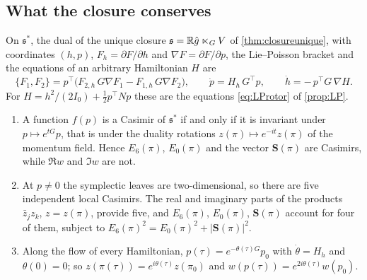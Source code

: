 \subsection{What the closure conserves}
\label{sec:restconserve}

On $\mathfrak s^*$, the dual of the unique closure $\mathfrak s=\mathbb{R}\hat g\ltimes_GV$ of \cref{thm:closureunique}, with coordinates $(h,p)$,
$F_h=\partial F/\partial h$ and $\nabla F=\partial F/\partial p$, the Lie--Poisson bracket and the equations of an arbitrary Hamiltonian $H$ are
\begin{equation}
\label{eq:restLPgen}
\{F_1,F_2\}=p^{\!\top}\bigl(F_{2,h}\,G\nabla F_1-F_{1,h}\,G\nabla F_2\bigr),\qquad
\dot p=H_h\,G^{\!\top}p,\qquad \dot h=-\,p^{\!\top}G\,\nabla H .
\end{equation}
For $H=h^2/(2I_0)+\tfrac12p^{\!\top}Np$ these are the equations \eqref{eq:LProtor} of \cref{prop:LP}.

\begin{theorem}
\label{cl:frozen}
\begin{enumerate}[label=(\roman*),leftmargin=2.2em]
\item A function $f(p)$ is a Casimir of $\mathfrak s^*$ if and only if it is invariant under $p\mapsto e^{tG}p$, that is under the duality rotations
$z(\pi)\mapsto e^{-it}z(\pi)$ of the momentum field. Hence $E_6(\pi)$, $E_0(\pi)$ and the vector $\mathbf S(\pi)$ are Casimirs, while $\Re w$ and
$\Im w$ are not.
\item At $p\neq0$ the symplectic leaves are two-dimensional, so there are five independent local Casimirs. The real and imaginary parts of the
products $\bar z_jz_k$, $z=z(\pi)$, provide five, and $E_6(\pi)$, $E_0(\pi)$, $\mathbf S(\pi)$ account for four of them, subject to
$E_6(\pi)^2=E_0(\pi)^2+|\mathbf S(\pi)|^2$.
\item Along the flow of every Hamiltonian, $p(\tau)=e^{-\theta(\tau)G}p_0$ with $\dot\theta=H_h$ and $\theta(0)=0$; so
$z(\pi(\tau))=e^{i\theta(\tau)}z(\pi_0)$ and $w(p(\tau))=e^{2i\theta(\tau)}w(p_0)$.
\end{enumerate}
\end{theorem}

